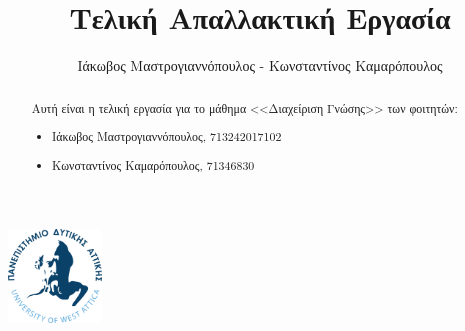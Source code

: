 \documentclass[
  11pt,
  singlespacing,
  liststotoc,
  toctotoc,
  headspline
]{fphw}
\title{Τελική Απαλλακτική Εργασία}
\author{Ιάκωβος Μαστρογιαννόπουλος - Κωνσταντίνος Καμαρόπουλος}
\institute{Πανεπιστημιο Δυτικης Αττικης \\ Τμημα Μηχανικων Πληροφορικης και Υπολογιστων}
\begin{document}
\includegraphics[width=25mm]{Figures/Logo}
\maketitle

\begin{abstract}
  Αυτή είναι η τελική εργασία για το μάθημα <<Διαχείριση Γνώσης>> των φοιτητών:
  \begin{itemize}
      \item Ιάκωβος Μαστρογιαννόπουλος, 713242017102
      \item Κωνσταντίνος Καμαρόπουλος, 71346830
  \end{itemize}
\end{abstract}

\newpage
\tableofcontents
\listoffigures
\listoftables

\newpage


\end{document}
